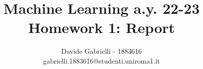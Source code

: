\documentclass{article}
\title{Machine Learning a.y. 22-23\\ \textbf{Homework 1: Report}}
\author{
Davide Gabrielli - 1883616\\
gabrielli.1883616@studenti.uniroma1.it
}
\begin{document}
\maketitle

\sloppy


%
\end{document}
